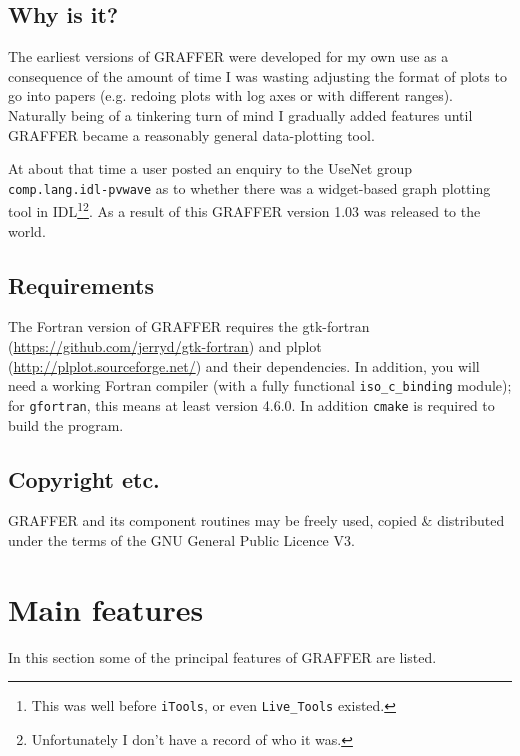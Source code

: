 \documentclass[11pt,twoside,english]{article}
\begin{document}
\subsection{Why is it?}

The earliest versions of GRAFFER were developed for my own use as a
consequence of the amount of time I was wasting adjusting the format of
plots to go into papers (e.g. redoing plots with log axes or with
different ranges). Naturally being of a tinkering turn of mind I
gradually added features until GRAFFER became a reasonably general
data-plotting tool.

At about that time a user posted an enquiry to the UseNet group
\texttt{comp.lang.idl-pvwave} as to whether there was a widget-based
graph plotting tool in IDL\footnote{This was well before
  \texttt{iTools}, or even \texttt{Live\_Tools}
  existed.}\footnote{Unfortunately I don't have a record of who it
  was.}. As a result of this GRAFFER version 1.03 was released to the
world.


\subsection{Requirements}

The Fortran version of GRAFFER requires the gtk-fortran
(\url{https://github.com/jerryd/gtk-fortran}) and plplot
(\url{http://plplot.sourceforge.net/}) and their dependencies. In
addition, you will need a working Fortran compiler (with a fully
functional \texttt{iso\_c\_binding} module); for \texttt{gfortran},
this means at least version 4.6.0. In addition \texttt{cmake} is
required to build the program.

\subsection{Copyright etc.}

GRAFFER and its component routines may be freely used, copied \&
distributed under the terms of the GNU General Public Licence V3.

\section{Main features}

In this section some of the principal features of GRAFFER are listed.
\end{document}
